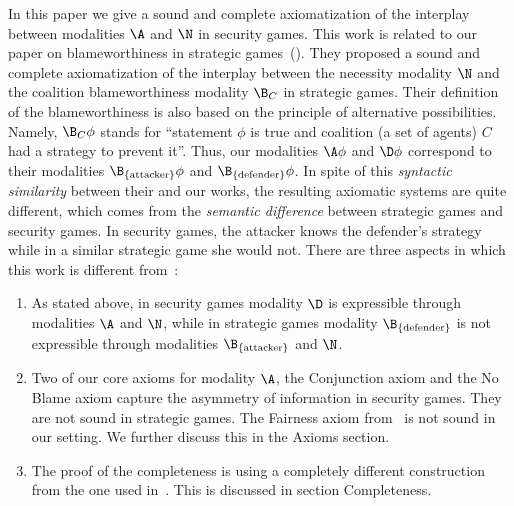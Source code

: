 \documentclass[letterpaper]{article}
\begin{document}
In this paper we give a sound and complete axiomatization of the interplay between modalities $\A$ and $\N$ in security games. This work is related to our paper on blameworthiness in strategic games~(\citeyear{nt19aaai}).
They proposed a sound and complete axiomatization of the interplay between the necessity modality $\N$ and the coalition blameworthiness modality $\B_C$ in strategic games. Their definition of the blameworthiness is also based on the principle of alternative possibilities.
Namely, $\B_C\phi$ stands for ``statement $\phi$ is true and coalition (a set of agents)  $C$ had a strategy to prevent it''. Thus, our modalities $\A\phi$ and $\D\phi$ correspond to their modalities $\B_{\{\mbox{\scriptsize attacker}\}}\phi$ and $\B_{\{\mbox{\scriptsize defender}\}}\phi$. %
In spite of this {\em syntactic similarity} between their and our works, the resulting axiomatic systems are quite different, which comes from the {\em semantic difference} between strategic games and security games. In security games, the attacker knows the defender's strategy while in a similar strategic game she would not. There are three aspects in which this work is different from~\cite{nt19aaai}:
\begin{enumerate}
    \item As stated above, in security games modality $\D$ is expressible through modalities $\A$ and $\N$, while in strategic games modality $\B_{\{\mbox{\scriptsize defender}\}}$ is not expressible through modalities $ \B_{\{\mbox{\scriptsize attacker}\}}$ and $\N$.
    \item Two of our core axioms for modality $\A$, the Conjunction axiom and the No Blame axiom capture the asymmetry of information in security games. They are not sound in strategic games. The Fairness axiom from~\cite{nt19aaai} is not sound in our setting. We further discuss this in the Axioms section.
    \item The proof of the completeness is using a completely different construction from the one used in~\cite{nt19aaai}. This is discussed in section Completeness.
\end{enumerate}

\end{document}

